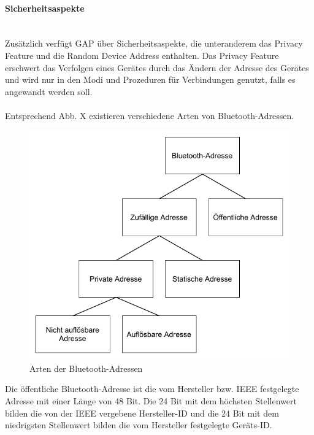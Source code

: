 \paragraph{Sicherheitsaspekte} \mbox{} \vspace{0.2cm} \\

Zusätzlich verfügt GAP über Sicherheitsaspekte, die unteranderem das Privacy Feature und die Random Device Address enthalten. Das Privacy Feature erschwert das Verfolgen eines Gerätes durch das Ändern der Adresse des Gerätes und wird nur in den Modi und Prozeduren für Verbindungen genutzt, falls es angewandt werden soll.\\\\

Entsprechend Abb. X existieren verschiedene Arten von Bluetooth-Adressen.
\begin{figure}[hbt!]
    \centering
    \includegraphics{graphics/BT_Adressen_Baum.pdf}
    \caption{Arten der Bluetooth-Adressen}
\end{figure}

Die öffentliche Bluetooth-Adresse ist die vom Hersteller bzw. IEEE festgelegte Adresse mit einer Länge von 48 Bit. Die 24 Bit mit dem höchsten Stellenwert bilden die von der IEEE vergebene Hersteller-ID und die 24 Bit mit dem niedrigsten Stellenwert bilden die vom Hersteller festgelegte Geräts-ID.

